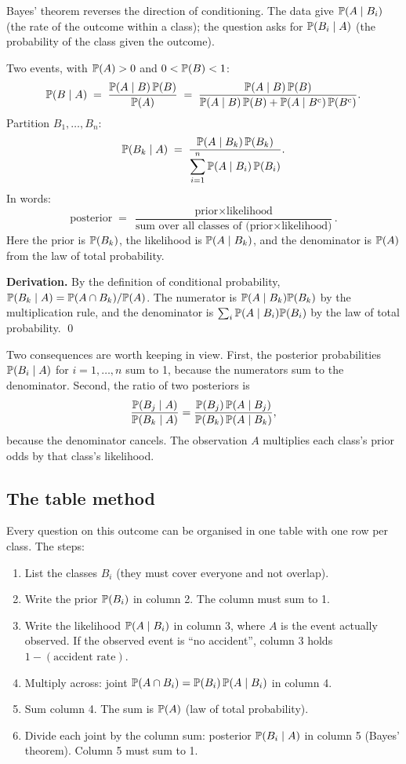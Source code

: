 Bayes' theorem reverses the direction of conditioning. The data give
$\mathbb{P}(A \mid B_i)$ (the rate of the outcome within a class); the question asks for
$\mathbb{P}(B_i \mid A)$ (the probability of the class given the outcome).

\begin{keyfact}
Two events, with $\mathbb{P}(A) > 0$ and $0 < \mathbb{P}(B) < 1$:
\[
\mathbb{P}(B \mid A) \;=\; \frac{\mathbb{P}(A \mid B)\,\mathbb{P}(B)}{\mathbb{P}(A)}
\;=\; \frac{\mathbb{P}(A \mid B)\,\mathbb{P}(B)}{\mathbb{P}(A \mid B)\,\mathbb{P}(B) + \mathbb{P}(A \mid B^{\mathrm{c}})\,\mathbb{P}(B^{\mathrm{c}})}.
\]
Partition $B_1, \dots, B_n$:
\[
\mathbb{P}(B_k \mid A) \;=\; \frac{\mathbb{P}(A \mid B_k)\,\mathbb{P}(B_k)}{\displaystyle\sum_{i=1}^{n} \mathbb{P}(A \mid B_i)\,\mathbb{P}(B_i)}.
\]
In words:
\[
\text{posterior} \;=\; \frac{\text{prior} \times \text{likelihood}}{\text{sum over all classes of (prior} \times \text{likelihood)}}.
\]
Here the prior is $\mathbb{P}(B_k)$, the likelihood is $\mathbb{P}(A \mid B_k)$, and the denominator is
$\mathbb{P}(A)$ from the law of total probability.
\end{keyfact}

\textbf{Derivation.} By the definition of conditional probability,
$\mathbb{P}(B_k \mid A) = \mathbb{P}(A \cap B_k)/\mathbb{P}(A)$. The numerator is
$\mathbb{P}(A \mid B_k)\mathbb{P}(B_k)$ by the multiplication rule, and the denominator is
$\sum_i \mathbb{P}(A \mid B_i)\mathbb{P}(B_i)$ by the law of total probability. \qed

Two consequences are worth keeping in view. First, the posterior probabilities
$\mathbb{P}(B_i \mid A)$ for $i = 1, \dots, n$ sum to 1, because the numerators sum to the
denominator. Second, the ratio of two posteriors is
\[
\frac{\mathbb{P}(B_j \mid A)}{\mathbb{P}(B_k \mid A)} = \frac{\mathbb{P}(B_j)\,\mathbb{P}(A \mid B_j)}{\mathbb{P}(B_k)\,\mathbb{P}(A \mid B_k)},
\]
because the denominator cancels. The observation $A$ multiplies each class's prior odds by
that class's likelihood.

\subsection{The table method}

Every question on this outcome can be organised in one table with one row per class. The
steps:
\begin{enumerate}[nosep,leftmargin=2em]
  \item List the classes $B_i$ (they must cover everyone and not overlap).
  \item Write the prior $\mathbb{P}(B_i)$ in column 2. The column must sum to 1.
  \item Write the likelihood $\mathbb{P}(A \mid B_i)$ in column 3, where $A$ is the event
        actually observed. If the observed event is ``no accident'', column 3 holds
        $1 - (\text{accident rate})$.
  \item Multiply across: joint $\mathbb{P}(A \cap B_i) = \mathbb{P}(B_i)\,\mathbb{P}(A \mid B_i)$ in column 4.
  \item Sum column 4. The sum is $\mathbb{P}(A)$ (law of total probability).
  \item Divide each joint by the column sum: posterior $\mathbb{P}(B_i \mid A)$ in column 5
        (Bayes' theorem). Column 5 must sum to 1.
\end{enumerate}

